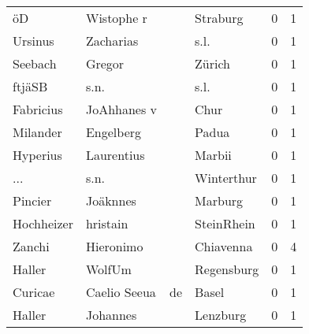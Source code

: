 \begin{center}
\begin{tiny}
\begin{longtabu}{llllrr}
                       öD &                         Wistophe r &             &                                    Straburg &          0 &         1 \\
                  Ursinus &                          Zacharias &             &                                        s.l. &          0 &         1 \\
                  Seebach &                             Gregor &             &                                      Zürich &          0 &         1 \\
                   ftjäSB &                               s.n. &             &                                        s.l. &          0 &         1 \\
                Fabricius &                        JoAhhanes v &             &                                        Chur &          0 &         1 \\
                 Milander &                          Engelberg &             &                                       Padua &          0 &         1 \\
                 Hyperius &                         Laurentius &             &                                      Marbii &          0 &         1 \\
                      ... &                               s.n. &             &                                  Winterthur &          0 &         1 \\
                  Pincier &                           Joäknnes &             &                                     Marburg &          0 &         1 \\
               Hochheizer &                           hristain &             &                                  SteinRhein &          0 &         1 \\
                   Zanchi &                          Hieronimo &             &                                   Chiavenna &          0 &         4 \\
                   Haller &                             WolfUm &             &                                  Regensburg &          0 &         1 \\
                  Curicae &                       Caelio Seeua &          de &                                       Basel &          0 &         1 \\
                   Haller &                           Johannes &             &                                    Lenzburg &          0 &         1 \\

\end{longtabu}
\end{tiny}
\end{center}
